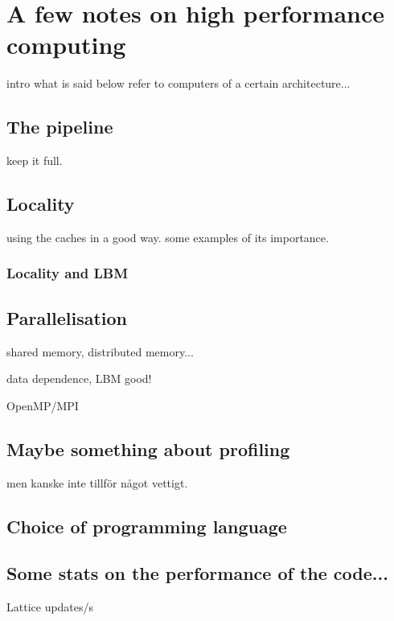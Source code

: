 \chapter{A few notes on high performance computing}
intro what is said below refer to computers of a certain
architecture... 

\section{The pipeline}
keep it full.

\section{Locality}
using the caches in a good way. some examples of its importance. 
\subsection{Locality and LBM}

\section{Parallelisation}
shared memory, distributed memory...

data dependence, LBM good!

OpenMP/MPI

\section{Maybe something about profiling}
men kanske inte tillför något vettigt.

\section{Choice of programming language}

\section{Some stats on the performance of the code...}
Lattice updates/s

